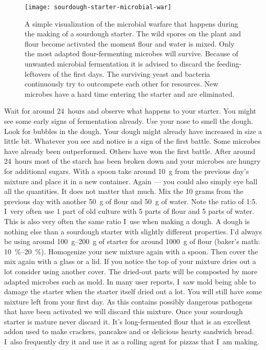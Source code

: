 \begin{figure}[!htb]
  \texttt{[image: sourdough-starter-microbial-war]}
  \caption[Microbial warfare during sourdough early days]{A simple
      visualization of the microbial warfare that happens during the making of
      a sourdough starter. The wild spores on the plant and flour become
      activated the moment flour and water is mixed.  Only the most adapted
      flour-fermenting microbes will survive. Because of unwanted microbial
      fermentation it is advised to discard the feeding-leftovers of the first
      days. The surviving yeast and bacteria continuously try to outcompete
      each other for resources. New microbes have a hard time entering the
      starter and are eliminated.}%
  \label{fig:sourdough-starter-microbial-war}
\end{figure}


Wait for around 24~hours and observe what happens to your starter.
You might see some early signs of fermentation already. Use your nose
to smell the dough. Look for bubbles in the dough. Your dough
might already have increased in size a little bit. Whatever
you see and notice is a sign of the first battle. Some microbes
have already been outperformed. Others have won the first battle.
After around 24~hours most of the starch has been broken down
and your microbes are hungry for additional sugars. With a spoon
take around \qty{10}{\gram} from the previous day's mixture and place
it in a new container. Again --- you could also simply eye ball
all the quantities. It does not matter that much. Mix the 10
grams from the previous day with another \qty{50}{\gram} of flour
and \qty{50}{\gram} of water. Note the ratio of 1:5. I~very often use
1 part of old culture with 5 parts of flour and 5 parts of water.
This is also very often the same ratio I~use when making a dough.
A dough is nothing else than a sourdough starter with slightly different
properties. I'd always be using around \qtyrange{100}{200}{\gram} of starter
for around \qty{1000}{\gram} of flour (baker's math: \qtyrange{10}{20}{\percent}).
Homogenize your new mixture again with a spoon. Then cover
the mix again with a glass or a lid. If you notice the top of
your mixture dries out a lot consider using another cover. The
dried-out parts will be composted by more adapted microbes such as
mold. In many user reports, I~saw mold being able to damage
the starter when the starter itself dried out a lot. You will
still have some mixture left from your first day. As this contains
possibly dangerous pathogens that have been activated we will discard
this mixture. Once your sourdough starter is mature never
discard it. It's long-fermented flour that is an excellent addon
used to make crackers, pancakes and or delicious hearty sandwich
bread. I~also frequently dry it and use it as a rolling agent
for pizzas that I~am making.

